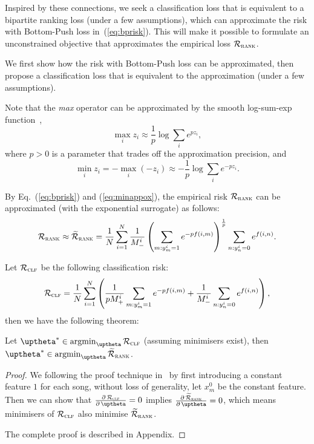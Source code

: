Inspired by these connections, we seek a classification loss that is equivalent to a bipartite ranking loss (under a few assumptions), 
which can approximate the risk with Bottom-Push loss in~(\ref{eq:bprisk}).
This will make it possible to formulate an unconstrained objective that approximates the empirical loss $\mathcal{R}_\textsc{rank}$.

We first show how the risk with Bottom-Push loss can be approximated,
then propose a classification loss that is equivalent to the approximation (under a few assumptions).

Note that the \emph{max} operator can be approximated by the smooth log-sum-exp function~\cite[p. 72]{boyd2004convex},
$$
\max_i z_i \approx \frac{1}{p} \log \sum_i e^{p z_i},
$$
where $p > 0$ is a parameter that trades off the approximation precision, and
\begin{equation}
\label{eq:minappox}
\min_i z_i = -\max_i (-z_i) \approx -\frac{1}{p} \log \sum_i e^{-p z_i}.
\end{equation}

By Eq.~(\ref{eq:bprisk}) and (\ref{eq:minappox}), the empirical risk $\mathcal{R}_\textsc{rank}$ can be approximated 
(with the exponential surrogate) as follows:
\begin{equation*}
\begin{aligned}
\mathcal{R}_\textsc{rank} 
\approx \widetilde{\mathcal{R}}_\textsc{rank}
= \frac{1}{N} \sum_{i=1}^N \frac{1}{M_-^i} \left( \sum_{m: y_m^i = 1} e^{-p f(i, m)} \right)^\frac{1}{p} \sum_{n: y_n^i = 0} e^{f(i, n)}.
\end{aligned}
\end{equation*}

Let $\mathcal{R}_\textsc{clf}$ be the following classification risk:
\begin{equation*}
\mathcal{R}_\textsc{clf} 
= \frac{1}{N} \sum_{i=1}^N \left( 
  \frac{1}{p M_+^i} \sum_{m: y_m^i = 1} e^{-p f(i, m)} 
  + \frac{1}{M_-^i} \sum_{n: y_n^i = 0} e^{f(i, n)} \right),
\end{equation*}
then we have the following theorem:
\begin{theorem}
\label{th:rank2clf}
Let $\uptheta^* \in \argmin_{\uptheta} \RCal_\textsc{clf}$ (assuming minimisers exist), 
then $\uptheta^* \in \argmin_{\uptheta} \widetilde\RCal_\textsc{rank}$.
\end{theorem}

\begin{proof}
We following the proof technique in~\cite{ertekin2011equivalence}
by first introducing a constant feature $1$ for each song,
without loss of generality, let $x_m^0$ be the constant feature.
Then we can show that 
$\frac{\partial \, \RCal_\textsc{clf}} {\partial \, \uptheta} = 0$ implies
$\frac{\partial \, \widetilde\RCal_\textsc{rank}} {\partial \, \uptheta} = 0$,
which means minimisers of $\mathcal{R}_\textsc{clf}$ also minimise $\widetilde{\mathcal{R}}_\textsc{rank}$.

The complete proof is described in Appendix.
\end{proof}


